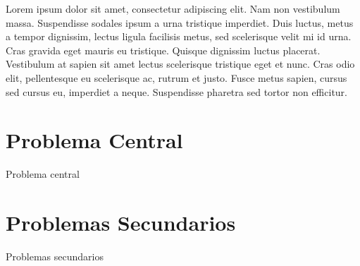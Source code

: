 Lorem ipsum dolor sit amet, consectetur adipiscing elit. Nam non vestibulum massa. Suspendisse sodales ipsum a urna tristique imperdiet. Duis luctus, metus a tempor dignissim, lectus ligula facilisis metus, sed scelerisque velit mi id urna. Cras gravida eget mauris eu tristique. Quisque dignissim luctus placerat. Vestibulum at sapien sit amet lectus scelerisque tristique eget et nunc. Cras odio elit, pellentesque eu scelerisque ac, rutrum et justo. Fusce metus sapien, cursus sed cursus eu, imperdiet a neque. Suspendisse pharetra sed tortor non efficitur.
\section{Problema Central}
Problema central
\section{Problemas Secundarios}
Problemas secundarios